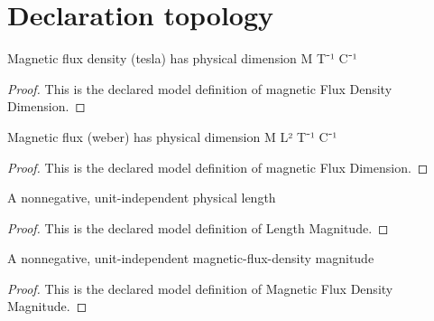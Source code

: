 \section{Declaration topology}
\begin{definition}
  \label{def:physics:phyx-mini-0925:phyxminiproblems-problemphyxmini0925-magneticfluxdensitydimension}
  Magnetic flux density (tesla) has physical dimension M T⁻¹ C⁻¹
\end{definition}
\begin{proof}
  This is the declared model definition of magnetic Flux Density Dimension.
\end{proof}
\begin{definition}
  \label{def:physics:phyx-mini-0925:phyxminiproblems-problemphyxmini0925-magneticfluxdimension}
  Magnetic flux (weber) has physical dimension M L² T⁻¹ C⁻¹
\end{definition}
\begin{proof}
  This is the declared model definition of magnetic Flux Dimension.
\end{proof}
\begin{definition}
  \label{def:physics:phyx-mini-0925:phyxminiproblems-problemphyxmini0925-lengthmagnitude}
  A nonnegative, unit-independent physical length
\end{definition}
\begin{proof}
  This is the declared model definition of Length Magnitude.
\end{proof}
\begin{definition}
  \label{def:physics:phyx-mini-0925:phyxminiproblems-problemphyxmini0925-magneticfluxdensitymagnitude}
  A nonnegative, unit-independent magnetic-flux-density magnitude
\end{definition}
\begin{proof}
  This is the declared model definition of Magnetic Flux Density Magnitude.
\end{proof}
